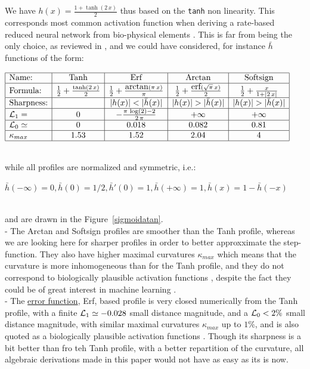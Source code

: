 \documentclass[a4]{article}
\newcommand{\eqline}[1]{~\vspace{0.1cm}\\\centerline{$#1$}\vspace{0.1cm}\\}
\begin{document}
We have $h(x) = \frac{1 + \tanh(2 \, x)}{2}$ thus based on the {\tt tanh} non linearity. This corresponds most common activation function
when deriving a rate-based reduced neural network from bio-physical elements  \cite{cessac_neuron_2007}. This is far from being the only choice,
as reviewed in \cite{szandala_review_2020}, and we could have considered, for instance
$\bar{h}$ functions of the form:
\eqline{\begin{array}{|l|c|c|c|c|ll}\hline
 \mbox{Name:} &   \mbox{Tanh} & \mbox{Erf} & \mbox{Arctan} & \mbox{Softsign} \\\hline
 \mbox{Formula:} &
   \frac{1}{2} + \frac{\tanh(2 \, x)}{2} &
   \frac{1}{2} + \frac{\mbox{arctan}\left(\pi  \, x\right)}{\pi} &
   \frac{1}{2} + \frac{\mbox{erf}(\sqrt{\pi} \, x)}{2} &
  \frac{1}{2} + \frac{x}{1 + |2 \, x|} \\\hline
  \mbox{Sharpness:} & & |h(x)| < |\bar{h}(x)| & |h(x)| > |\bar{h}(x)| & |h(x)| > |\bar{h}(x)| \\\hline
  {\cal L}_1 = & 0 & -\frac{\pi  \,\log\left(2\right)-2}{2 \,\pi} & +\infty & +\infty \\\hline
  {\cal L}_0 \simeq & 0 & 0.018 & 0.082 & 0.81 \\\hline
  \kappa_{max} & 1.53 & 1.52 & 2.04 & 4 \\\hline
  \end{array}}
while all profiles are normalized and symmetric, i.e.:
\eqline{\bar{h}(-\infty) = 0, \bar{h}(0) = 1/2, \bar{h}'(0) = 1, \bar{h}(+\infty) = 1, \bar{h}(x) = 1 - \bar{h}(-x)}
and are drawn in the Figure~\ref{sigmoidatan}.
\\ - The {Arctan} and {Softsign} profiles are smoother than the Tanh profile, whereas we are looking here for sharper profiles in order to better approxximate the step-function. They also have higher maximal curvatures $\kappa_{max}$ which means that the curvature is more inhomogeneous than for the Tanh profile, and they do not correspond to biologically plausible activation functions \cite{cessac_neuron_2007}, despite the fact they could be of great interest in machine learning \cite{szandala_review_2020}.
\\ - The \href{https://en.wikipedia.org/wiki/Error_function}{error function}, Erf, based profile is very closed numerically from the Tanh profile, with a finite ${\cal L}_1\simeq -0.028$ small distance magnitude, and a ${\cal L}_0 < 2\%$ small distance magnitude, with similar maximal curvatures $\kappa_{max}$ up to $1\%$, and is also quoted as a biologically plausible activation functions \cite{cessac_neuron_2007}. Though its sharpness is a bit better than fro teh Tanh profile, with a better repartition of the curvature, all algebraic derivations made in this paper would not have as easy as its is now.
\end{document}
